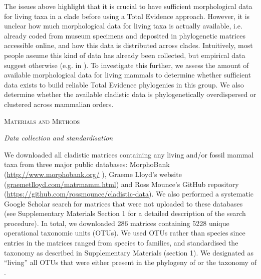 \documentclass[12pt,letterpaper]{article}
\renewcommand{\section}[1]{%
\bigskip
\begin{center}
\begin{Large}
\normalfont\scshape #1
\medskip
\end{Large}
\end{center}}
\renewcommand{\subsection}[1]{%
\bigskip
\begin{center}
\begin{large}
\normalfont\itshape #1
\end{large}
\end{center}}
\begin{document}
The issues above highlight that it is crucial to have sufficient morphological data for living taxa in a clade before using a Total Evidence approach.
However, it is unclear how much morphological data for living taxa is actually available, i.e. already coded from museum specimens and deposited in phylogenetic matrices accessible online, and how this data is distributed across clades.
Intuitively, most people assume this kind of data has already been collected, but empirical data suggest otherwise (e.g. in \cite{ronquista2012,slaterphylogenetic2013,beckancient2014}).
To investigate this further, we assess the amount of available morphological data for living mammals to determine whether sufficient data exists to build reliable Total Evidence phylogenies in this group.
We also determine whether the available cladistic data is phylogenetically overdispersed or clustered across mammalian orders.

%
%
\section{Materials and Methods}
\subsection{Data collection and standardisation}
We downloaded all cladistic matrices containing any living and/or fossil mammal taxa from three major public databases: MorphoBank (\url{http://www.morphobank.org/} \cite{morphobank}), Graeme Lloyd's website (\url{graemetlloyd.com/matrmamm.html}) and Ross Mounce's GitHub repository (\url{https://github.com/rossmounce/cladistic-data}).
We also performed a systematic Google Scholar search for matrices that were not uploaded to these databases (see Supplementary Materials Section 1 for a detailed description of the search procedure).
In total, we downloaded 286 matrices containing 5228 unique operational taxonomic units (OTUs). 
We used OTUs rather than species since entries in the matrices ranged from species to families, and standardised the taxonomy as described in Supplementary Materials (section 1). 
We designated as ``living'' all OTUs that were either present in the phylogeny of \cite{BinindaEmonds} or the taxonomy of \cite{wilson2005mammal}.
\end{document}
